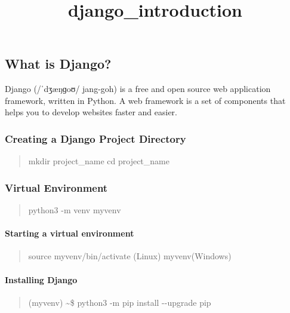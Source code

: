 \documentclass[11pt]{article}
\title{django\_introduction}
\begin{document}
    
    
    \maketitle
    
    

    
    \subsection{What is Django?}\label{what-is-django}

Django (/ˈdʒæŋɡoʊ/ jang-goh) is a free and open source web application
framework, written in Python. A web framework is a set of components
that helps you to develop websites faster and easier.

\subsubsection{Creating a Django Project
Directory}\label{creating-a-django-project-directory}

\begin{quote}
mkdir project\_name cd project\_name
\end{quote}

\subsubsection{Virtual Environment}\label{virtual-environment}

\begin{quote}
python3 -m venv myvenv
\end{quote}

\paragraph{Starting a virtual
environment}\label{starting-a-virtual-environment}

\begin{quote}
source myvenv/bin/activate (Linux) myvenv\Scripts\activate (Windows)
\end{quote}

\paragraph{Installing Django}\label{installing-django}

\begin{quote}
(myvenv) \textasciitilde{}\$ python3 -m pip install -\/-upgrade pip
\end{quote}
\end{document}
